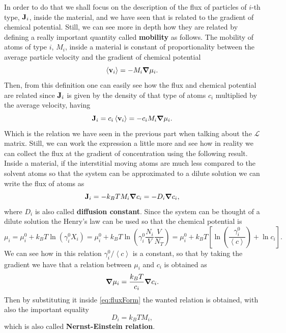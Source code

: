 In order to do that we shall focus on the description of the flux of particles of $i$-th type, $\vb{J}_i$, inside the material, and we have seen that is related to the gradient of chemical potential. Still, we can see more in depth how they are related by defining a really important quantity called \textbf{mobility} as follows.
{
    The mobility of atoms of type $i$, $M_i$, inside a material is constant of proportionality between the average particle velocity and the gradient of chemical potential
    \begin{equation}
        \left\langle \vb{v}_i \right\rangle = -M_i\grad \mu_i.
    \end{equation}
}
\noindent
Then, from this definition one can easily see how the flux and chemical potential are related since $\vb{J}_i$ is given by the density of that type of atoms $c_i$ multiplied by the average velocity, having
\begin{equation}
    \label{eq:fluxForm}
    \vb{J}_i = c_i \left\langle \vb{v}_i \right\rangle = -c_iM_i\grad \mu_i.
\end{equation}
Which is the relation we have seen in the previous part when talking about the $\mathcal{L}$ matrix. Still, we can work the expression a little more and see how in reality we can collect the flux at the gradient of concentration using the following result.
{
    Inside a material, if the interstitial moving atoms are much less compared to the solvent atoms so that the system can be approximated to a dilute solution we can write the flux of atoms as
    \begin{equation}
        \label{eq:FickLaw}
        \vb{J}_i = -k_B TM_i\grad c_i = -D_i\grad c_i,
    \end{equation}
    where $D_i$ is also called \textbf{diffusion constant}.
}
{
    Since the system can be thought of a dilute solution the Henry’s law can be used so that the chemical potential is
    \begin{equation}
        \mu_i = \mu_i^0 + k_BT\ln\left( \gamma_i^0X_i \right) = \mu_i^0 + k_BT\ln\left( \gamma_i^0\frac{N_i}{V}\frac{V}{N_T} \right) = \mu_i^0 + k_BT\left[ \ln\left( \frac{\gamma_i^0}{\left\langle c \right\rangle} \right) + \ln c_i\right].
    \end{equation}
    We can see how in this relation $\gamma_i^0/\left\langle c \right\rangle$ is a constant, so that by taking the gradient we have that a relation between $\mu_i$ and $c_i$ is obtained as
    \begin{equation}
        \grad \mu_i = \frac{k_BT}{c_i}\grad c_i.
    \end{equation}
    Then by substituting it inside \eqref{eq:fluxForm} the wanted relation is obtained, with also the important equality
    \begin{equation}
        D_i = k_BTM_i,
    \end{equation}
    which is also called \textbf{Nernst-Einstein relation}.
}

